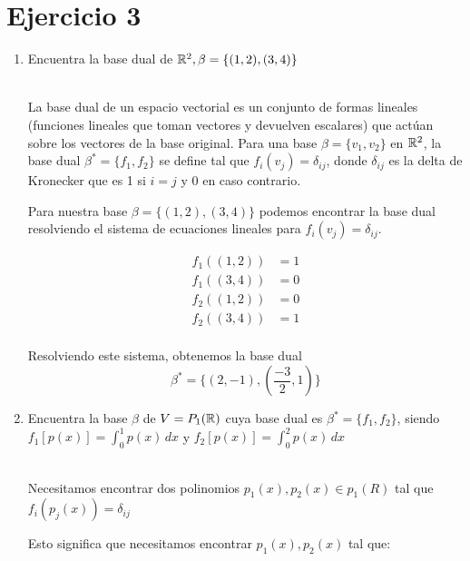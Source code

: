 \section*{Ejercicio 3}

\begin{enumerate}
    \item Encuentra la base dual de $\mathbb{R}^{2}, \beta = \{ (1,2),(3,4) \}$
    
    \noindent \solucion \\

    La base dual de un espacio vectorial es un conjunto de formas lineales
    (funciones lineales que toman vectores y devuelven escalares) que 
    actúan sobre los vectores de la base original. Para una base $\beta = \{v_{1},v_{2}\}$
    en $\mathbb{R}^{2}$, la base dual $\beta^{*} = \{ f_{1},f_{2} \}$ se define tal que
    $f_{i}(v_{j}) = \delta_{ij}$, donde $\delta_{ij}$ es la delta de Kronecker que es 1 si
    $i = j$ y 0 en caso contrario.

    Para nuestra base $\beta = \{ (1,2),(3,4) \}$ podemos encontrar la base dual
    resolviendo el sistema de ecuaciones lineales para $f_{i}(v_{j}) = \delta_{ij}$.

    \begin{align*}
        f_1((1,2)) & = 1 \\
        f_1((3,4)) & = 0 \\
        f_2((1,2)) & = 0 \\
        f_2((3,4)) & = 1 \\
    \end{align*}

    Resolviendo este sistema, obtenemos la base dual 
    \begin{equation*}
        \beta^{*} = \{ (2,-1), \left( \frac{-3}{2} , 1 \right) \}
    \end{equation*}

    \item Encuentra la base $\beta$ de $V = P_{1} (\mathbb{R})$ cuya base dual es
          $\beta^{*} = \{ f_{1},f_{2} \}$, siendo 
          $f_{1} \left[ p(x) \right] = \int_{0}^{1} p(x) \, dx$
          y $f_{2} \left[ p(x) \right] = \int_{0}^{2} p(x) \, dx$ 

    \noindent \solucion \\

    Necesitamos encontrar dos polinomios $p_{1}(x), p_{2}(x) \in p_{1}(R)$ tal que 
    $f_{i}(p_{j}(x)) = \delta_{ij}$

    Esto significa que necesitamos encontrar $p_{1}(x),p_{2}(x)$ tal que:


\end{enumerate}
